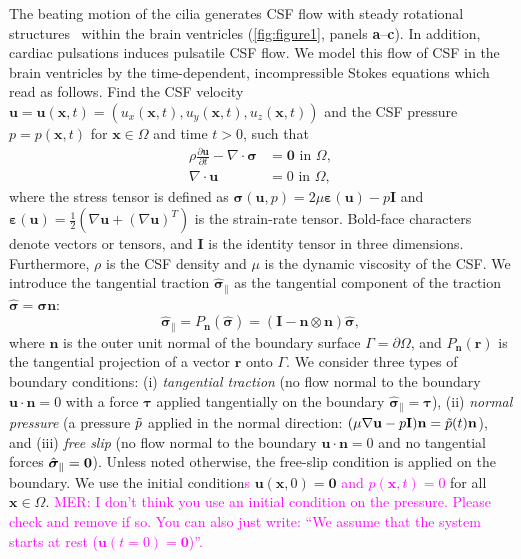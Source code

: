 \documentclass[fleqn]{wlscirep}
\newcommand{\pdifft}[1]{\frac{\partial  #1}{\partial t}}
\newcommand{\nn}{\mathbf{n}}
\newcommand{\rr}{\mathbf{r}}
\newcommand{\uu}{\mathbf{u}}
\newcommand{\xx}{\bm{x}}
\newcommand{\bsig}{\bm{\sigma}}
\newcommand{\bsigpar}{\hat{\bsig}_{\parallel}}
\newcommand{\beps}{\bm{\varepsilon}}
\newcommand{\btau}{\bm{\tau}}
\newcommand{\mer}[1]{\textcolor{magenta}{#1}}
\begin{document}
The beating motion of the cilia generates CSF flow with steady rotational structures~\cite{Olstad2019CiliaryDevelopment} within the brain ventricles (\cref{fig:figure1}, panels \textbf{a}--\textbf{c}). In addition, cardiac pulsations induces pulsatile CSF flow. We model this flow of CSF in the brain ventricles by the time-dependent, incompressible Stokes equations which read as follows. Find the CSF velocity $\uu = \uu(\xx, t) = (u_x(\xx, t), u_y(\xx, t), u_z(\xx, t))$ and the CSF pressure $p = p(\xx, t)$ for $\xx \in \Omega$ and time $t>0$, such that
\begin{subequations}
    \begin{align}
  \rho\pdifft{\uu} - \nabla \cdot \bsig &= \mathbf{0}\mbox{ in }\Omega,\label{eq:stokes_eq_mom}\\
  \nabla \cdot \uu &= 0\mbox{ in }\Omega,
  \end{align}
  \label{eq:stokes_eqs}%
\end{subequations}%
where the stress tensor is defined as $\bsig(\uu, p) = 2\mu\beps(\uu) - p\mathbf{I}$ and $\beps(\uu) = \frac{1}{2}\left(\nabla \uu + (\nabla\uu)^T\right)$ is the strain-rate tensor. Bold-face characters denote vectors or tensors, and $\mathbf{I}$ is the identity tensor in three dimensions. Furthermore, $\rho$ is the CSF density and $\mu$ is the dynamic viscosity of the CSF. We introduce the tangential traction $\bsigpar$ as the tangential component of the traction $\hat{\bsig}=\bsig\nn$:
\begin{equation*}
    \bsigpar = P_{\nn}(\hat{\bsig}) = (\mathbf{I} - \nn\otimes\nn)\hat{\bsig},
\end{equation*}
where $\nn$ is the outer unit normal of the boundary surface $\Gamma = \partial\Omega$, and $P_{\nn}(\rr)$ is the tangential  projection of a vector $\rr$ onto $\Gamma$. We consider three types of boundary conditions:  (i) \emph{tangential traction} (no flow normal to the boundary $\uu \cdot \nn = 0$ with a force $\btau$ applied tangentially on the boundary $\bsigpar = \btau$), (ii) \emph{normal pressure} (a pressure $\Tilde{p}$ applied in the normal direction: $(\mu\nabla\uu - p\mathbf{I})\nn = \Tilde{p}(t)\nn$), and (iii) \emph{free slip} (no flow normal to the boundary $\uu \cdot \nn = 0$ and no tangential forces $\bsigpar = {\bf 0}$). Unless noted otherwise, the free-slip condition is applied on the boundary. We use the initial condition\mer{s} $\uu(\xx, 0)=\mathbf{0}$ \mer{and $p(\xx, t) = 0$} for all $\xx\in\Omega$. \mer{MER: I don't think you use an initial condition on the pressure. Please check and remove if so. You can also just write: ``We assume that the system starts at rest ($\uu(t = 0) = \mathbf{0}$)''.}
\end{document}
